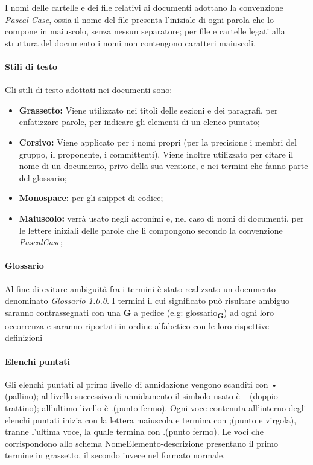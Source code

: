 I nomi delle cartelle e dei file relativi ai documenti adottano la convenzione \textit{Pascal Case}, ossia il nome del file presenta l'iniziale di ogni parola che lo compone in maiuscolo, senza nessun separatore; per file e cartelle legati alla struttura del documento i nomi non contengono caratteri maiuscoli.

\paragraph{Stili di testo}

Gli stili di testo adottati nei documenti sono: 

\begin{itemize}

	\item \textbf{Grassetto:} Viene utilizzato nei titoli delle sezioni e dei paragrafi, per enfatizzare parole, per indicare gli elementi di un elenco puntato;
	\item \textbf{Corsivo:} Viene applicato per i nomi propri (per la precisione i membri del gruppo, il proponente, i committenti), Viene inoltre utilizzato per citare il nome di un documento, privo della sua versione, e nei termini che fanno parte del glossario;
	\item \textbf{Monospace:} per gli snippet di codice;
	\item \textbf{Maiuscolo:} verrà usato negli acronimi e, nel caso di nomi di documenti, per le lettere iniziali delle parole che li compongono secondo la convenzione \textit{PascalCase};

\end{itemize}

\paragraph{Glossario}  

Al fine di evitare ambiguità fra i termini è stato realizzato un documento denominato \textit{Glossario 1.0.0.} I termini il cui significato può risultare ambiguo saranno contrassegnati con una \textbf{G} a pedice (e.g: \texorpdfstring{glossario\textsubscript{\textbf{G}}})) ad ogni loro occorrenza e  saranno riportati in ordine alfabetico con le loro rispettive definizioni

\paragraph{Elenchi puntati}

Gli elenchi puntati al primo livello di annidazione vengono scanditi con • (pallino); al livello successivo di annidamento il simbolo usato è -- (doppio trattino); all'ultimo livello è .(punto fermo).\newline
Ogni voce contenuta all'interno degli elenchi puntati inizia con la lettera maiuscola e termina con ;(punto e virgola), tranne l'ultima voce, la quale termina con .(punto fermo).\newline
Le voci che corrispondono allo schema NomeElemento-descrizione presentano il primo termine in grassetto, il secondo invece nel formato normale. 


